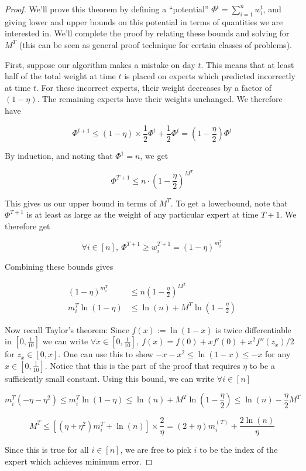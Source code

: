 \documentclass[11pt]{article}
\begin{document}
\begin{proof} We'll prove this theorem by defining a ``potential'' $\Phi^{t}=\sum_{i=1}^n w_{i}^{t}$, and giving lower and upper bounds on this potential in terms of quantities we are interested in. We'll complete the proof by relating these bounds and solving for $M^T$ (this can be seen as general proof technique for certain classes of problems). 

First, suppose our algorithm makes a mistake on day $t$. This means that at least half of the total weight at time $t$ is placed on experts which predicted incorrectly at time $t$. For these incorrect experts, their weight decreases by a factor of $(1-\eta)$. The remaining experts have their weights unchanged. We therefore have 

$$\Phi^{t+1} \leq  (1-\eta) \times \frac{1}{2} \Phi^{t}+\frac{1}{2} \Phi^{t}=(1-\frac{\eta}{2})\Phi^{t}$$

By induction, and noting that $\Phi^1=n$, we get

$$\Phi^{T+1} \leq n\cdot (1-\frac{\eta}{2})^{M^{T}} $$ 

This gives us our upper bound in terms of $M^T$. To get a lowerbound, note that $\Phi^{T+1}$ is at least as large as the weight of any particular expert at time $T+1$. We therefore get

$$\forall i \in [n],\ \Phi^{T+1} \geq w_{i}^{T+1} = (1-\eta)^{m_{i}^{T}}$$

Combining these bounds gives

\begin{align*}
(1-\eta)^{m_{i}^{T}} &\leq n(1-\frac{\eta}{2})^{M^{T}}\\
m_{i}^{T} \ln(1-\eta) &\leq\ln(n) +M^{T} \ln(1-\frac{\eta}{2})
\end{align*}


Now recall Taylor's theorem: Since $f(x):=\ln(1-x)$ is twice differentiable in $[0,\frac{1}{10}]$ we can write $\forall x \in [0,\frac{1}{10}],\ f(x)=f(0)+xf'(0)+x^2 f''(z_{x})/2$ for $z_{x} \in [0,x]$. One can use this to show $-x-x^2 \leq \ln(1-x) \leq -x$ for any $x \in [0,\frac{1}{10}]$. Notice that this is the part of the proof that requires $\eta$ to be a sufficiently small constant. Using this bound, we can write $\forall i \in [n]$

$$ m_{i}^{T}( -\eta -\eta^2) \leq m_{i}^{T} \ln(1-\eta) \leq \ln(n) +M^{T} \ln(1-\frac{\eta}{2}) \leq \ln(n)-\frac{\eta}{2} M^{T}$$

$$M^{T} \leq \left [(\eta +\eta^2)m_i^T+\ln(n) \right ] \times \frac{2}{\eta}=(2+\eta) m_{i}^{(T)} +\frac{2 \ln(n)}{\eta}$$

Since this is true for all $i\in [n]$, we are free to pick $i$ to be the index of the expert which achieves minimum error. 

\end{proof}
\end{document}
